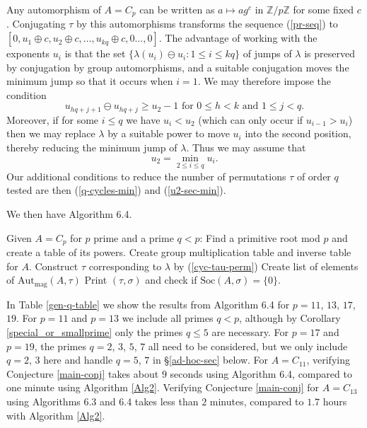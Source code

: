 \documentclass[letterpaper,12pt]{amsart}
\numberwithin{equation}{section}
\numberwithin{algorithm}{section}
\theoremstyle{definition}
\newcommand{\Z}{\mathbb{Z}}
\newcommand{\id}{\mathrm{id}}
\newcommand{\Soc}{\mathrm{Soc}}
\newcommand{\Autmag}{\mathrm{Aut}_\mathrm{mag}}
\newcommand{\bs}{\backslash}
\begin{document}
 Any automorphism of $A=C_p$ can be written as $a \mapsto ag^c$ in $\Z/p\Z$ for some fixed $c$. Conjugating $\tau$ by this automorphisms transforms the sequence (\ref{pr-seq}) to $[0,u_1\oplus c, u_2\oplus c, \ldots, u_{kq} \oplus c, 0 \ldots, 0]$. The advantage of working with the exponents $u_i$ is that the set $\{  \lambda(u_i) \ominus u_i : 1 \leq i \leq kq \}$ of jumps of $\lambda$ is preserved by conjugation by group automorphisms, and a suitable conjugation moves the minimum jump so that it occurs when $i=1$. 
 We may therefore impose the condition
 \begin{equation} \label{q-cycles-min}
 	u_{hq+j+1} \ominus u_{hq+j} \geq u_2-1 \mbox{ for } 0 \leq h < k \mbox{ and } 1 \leq j < q. 
 \end{equation}
Moreover, if for some $i \leq q$ we have $u_i<u_2$ (which can only occur if $u_{i-1}>u_i$) then we may replace $\lambda$ by a suitable power to move $u_i$ into the second position, thereby reducing the minimum jump of $\lambda$. Thus we may assume that 
\begin{equation} \label{u2-sec-min}
	u_2 = \min_{2 \leq i \leq q} u_i.
\end{equation} 
Our additional conditions to reduce the number of permutations $\tau$ of order $q$ tested are then (\ref{q-cycles-min}) and (\ref{u2-sec-min}).

We then have Algorithm 6.4.

\begin{algorithm}  \label{Alg4}
	\caption{Test of Conjecture \ref{main-conj} for $A=C_p$, $\tau$ of order $q$}
	\begin{algorithmic} 
		\State Given $A=C_p$ for $p$ prime and a prime $q<p$:
		\State Find a primitive root mod $p$ and create a table of its powers.
		\State Create group multiplication table and inverse table for $A$.
		\State Construct $\tau$ corresponding to $\lambda$ by (\ref{cyc-tau-perm})
		\If{$\Soc(A,\tau)=\{0\}$}
		\State Create list of elements of $\Autmag(A,\tau)$
		\For{$\sigma \in \Autmag(A,\tau) \bs \{\id\}$}
		\State Print $(\tau,\sigma)$ and check if $\Soc(A,\sigma)=\{0\}$.
		\EndFor
		\EndIf
		\EndFor
	\end{algorithmic}
\end{algorithm}

 In Table \ref{gen-q-table} we show the results from Algorithm 6.4 for $p=11$, $13$, $17$, $19$. 
 For $p=11$ and $p=13$ we include all primes $q<p$, although by Corollary \ref{special_or_smallprime} only the primes $q \leq 5$ are necessary. For $p=17$ and $p=19$, the primes $q=2$, $3$, $5$, $7$ all need to be considered, but we only include $q=2$, $3$ here and handle $q=5$, $7$ in \S\ref{ad-hoc-sec} below. For $A=C_{11}$, verifying Conjecture \ref{main-conj} takes about $9$ seconds using Algorithm 6.4, compared to one minute using Algorithm \ref{Alg2}. Verifying Conjecture \ref{main-conj} for $A=C_{13}$ using Algorithms 6.3 and 6.4 takes less than $2$ minutes, compared to $1.7$ hours with Algorithm \ref{Alg2}. 
 
\end{document}
